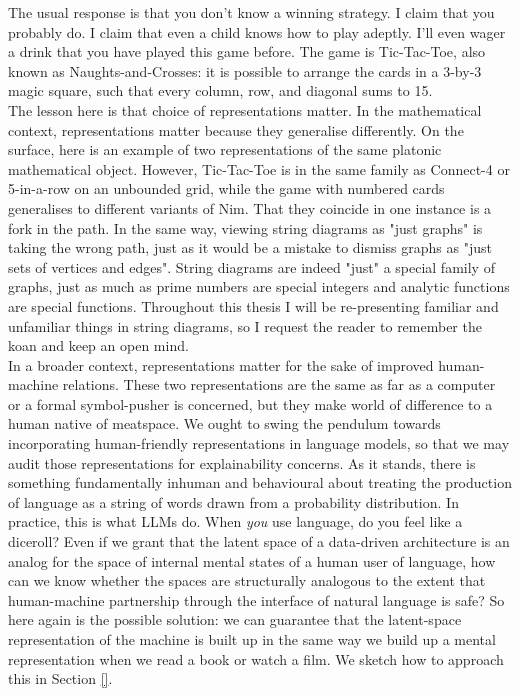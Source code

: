 The usual response is that you don't know a winning strategy. I claim that you probably do. I claim that even a child knows how to play adeptly. I'll even wager a drink that you have played this game before. The game is Tic-Tac-Toe, also known as Naughts-and-Crosses: it is possible to arrange the cards in a 3-by-3 magic square, such that every column, row, and diagonal sums to 15.\\

The lesson here is that choice of representations matter. In the mathematical context, representations matter because they generalise differently. On the surface, here is an example of two representations of the same platonic mathematical object. However, Tic-Tac-Toe is in the same family as Connect-4 or 5-in-a-row on an unbounded grid, while the game with numbered cards generalises to different variants of Nim. That they coincide in one instance is a fork in the path. In the same way, viewing string diagrams as "just graphs" is taking the wrong path, just as it would be a mistake to dismiss graphs as "just sets of vertices and edges". String diagrams are indeed "just" a special family of graphs, just as much as prime numbers are special integers and analytic functions are special functions. Throughout this thesis I will be re-presenting familiar and unfamiliar things in string diagrams, so I request the reader to remember the koan and keep an open mind.\\

In a broader context, representations matter for the sake of improved human-machine relations. These two representations are the same as far as a computer or a formal symbol-pusher is concerned, but they make world of difference to a human native of meatspace. We ought to swing the pendulum towards incorporating human-friendly representations in language models, so that we may audit those representations for explainability concerns. As it stands, there is something fundamentally inhuman and behavioural about treating the production of language as a string of words drawn from a probability distribution. In practice, this is what LLMs do. When \emph{you} use language, do you feel like a diceroll? Even if we grant that the latent space of a data-driven architecture is an analog for the space of internal mental states of a human user of language, how can we know whether the spaces are structurally analogous to the extent that human-machine partnership through the interface of natural language is safe? So here again is the possible solution: we can guarantee that the latent-space representation of the machine is built up in the same way we build up a mental representation when we read a book or watch a film. We sketch how to approach this in Section \ref{}.


